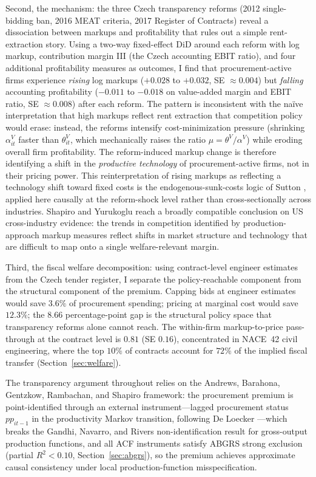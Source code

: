 \documentclass[11pt]{article}
\begin{document}
Second, the mechanism: the three Czech transparency reforms (2012 single-bidding ban, 2016 MEAT criteria, 2017 Register of Contracts) reveal a dissociation between markups and profitability that rules out a simple rent-extraction story. Using a two-way fixed-effect DiD around each reform with log markup, contribution margin III (the Czech accounting EBIT ratio), and four additional profitability measures as outcomes, I find that procurement-active firms experience \emph{rising} log markups ($+0.028$ to $+0.032$, SE $\approx 0.004$) but \emph{falling} accounting profitability ($-0.011$ to $-0.018$ on value-added margin and EBIT ratio, SE $\approx 0.008$) after each reform. The pattern is inconsistent with the na\"ive interpretation that high markups reflect rent extraction that competition policy would erase: instead, the reforms intensify cost-minimization pressure (shrinking $\alpha^V_{it}$ faster than $\theta^V_{it}$, which mechanically raises the ratio $\mu = \theta^V / \alpha^V$) while eroding overall firm profitability. The reform-induced markup change is therefore identifying a shift in the \emph{productive technology} of procurement-active firms, not in their pricing power. This reinterpretation of rising markups as reflecting a technology shift toward fixed costs is the endogenous-sunk-costs logic of Sutton \cite{Sutton1991}, applied here causally at the reform-shock level rather than cross-sectionally across industries. Shapiro and Yurukoglu \cite{ShapiroYurukoglu2025} reach a broadly compatible conclusion on US cross-industry evidence: the trends in competition identified by production-approach markup measures reflect shifts in market structure and technology that are difficult to map onto a single welfare-relevant margin.

Third, the fiscal welfare decomposition: using contract-level engineer estimates from the Czech tender register, I separate the policy-reachable component from the structural component of the premium. Capping bids at engineer estimates would save $3.6\%$ of procurement spending; pricing at marginal cost would save $12.3\%$; the $8.66$ percentage-point gap is the structural policy space that transparency reforms alone cannot reach. The within-firm markup-to-price pass-through at the contract level is $0.81$ (SE $0.16$), concentrated in NACE~42 civil engineering, where the top $10\%$ of contracts account for $72\%$ of the implied fiscal transfer (Section~\ref{sec:welfare}).

The transparency argument throughout relies on the Andrews, Barahona, Gentzkow, Rambachan, and Shapiro \cite{ABGRS2025} framework: the procurement premium is point-identified through an external instrument---lagged procurement status $pp_{it-1}$ in the productivity Markov transition, following De Loecker \cite{DeLoecker2013}---which breaks the Gandhi, Navarro, and Rivers \cite{GNR2020} non-identification result for gross-output production functions, and all ACF instruments satisfy ABGRS strong exclusion (partial $R^2 < 0.10$, Section~\ref{sec:abgrs}), so the premium achieves approximate causal consistency under local production-function misspecification.
\end{document}

